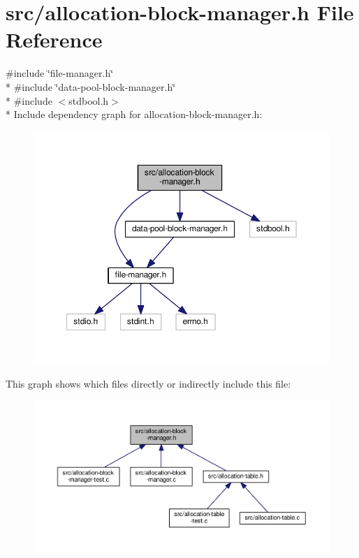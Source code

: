 \hypertarget{allocation-block-manager_8h}{\section{src/allocation-\/block-\/manager.h File Reference}
\label{allocation-block-manager_8h}
}
{\ttfamily \#include \char`\"{}file-\/manager.\-h\char`\"{}}\\*
{\ttfamily \#include \char`\"{}data-\/pool-\/block-\/manager.\-h\char`\"{}}\\*
{\ttfamily \#include $<$stdbool.\-h$>$}\\*
Include dependency graph for allocation-\/block-\/manager.h\-:
\nopagebreak
\begin{figure}[H]
\begin{center}
\leavevmode
\includegraphics[width=350pt]{allocation-block-manager_8h__incl}
\end{center}
\end{figure}
This graph shows which files directly or indirectly include this file\-:
\nopagebreak
\begin{figure}[H]
\begin{center}
\leavevmode
\includegraphics[width=350pt]{allocation-block-manager_8h__dep__incl}
\end{center}
\end{figure}
